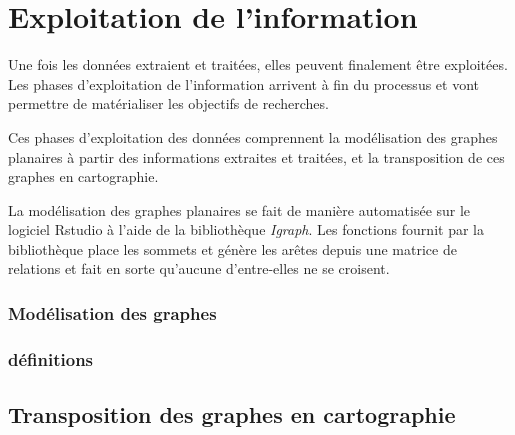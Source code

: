 \section{Exploitation de l'information}
Une fois les données extraient et traitées, elles peuvent finalement être exploitées.
Les phases d'exploitation de l'information  arrivent à fin du processus et vont permettre de matérialiser les objectifs de recherches.

Ces phases d'exploitation des données comprennent la modélisation des graphes planaires à partir des informations extraites et traitées, et la transposition de ces graphes en cartographie.

La modélisation des graphes planaires se fait de manière automatisée sur le logiciel Rstudio à l'aide de la bibliothèque \textit{Igraph}. Les fonctions fournit par la bibliothèque place les sommets et génère les arêtes depuis une matrice de relations et fait en sorte qu'aucune d'entre-elles ne se croisent. 

\subsubsection{Modélisation des graphes}
\subsubsection{définitions}



\subsection{Transposition des graphes en cartographie}
